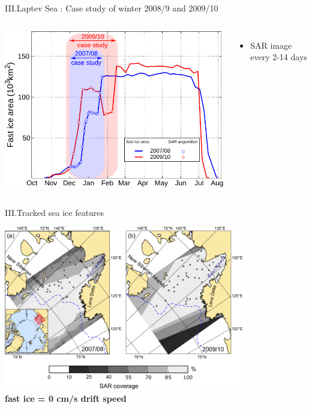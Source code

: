 \documentclass[8pt]{beamer}
\begin{document}
\setwatermark{\fontsize{125pt}{125pt}\selectfont{}}
\begin{frame}[fragile]{III.Laptev Sea : Case study of winter 2008/9 and 2009/10}
\begin{columns}
	\includegraphics[width=1\textwidth]{./img/casestudy.pdf}
	\begin{itemize}
		\item SAR image every 2-14 days
	\end{itemize}
\end{columns}
\end{frame}

\setwatermark{\fontsize{125pt}{125pt}\selectfont{}}
\begin{frame}[fragile]{III.Tracked sea ice features}

		\begin{center}
		\includegraphics[width=0.8\textwidth]{./img/trackpoints.pdf}\\
		\textbf{fast ice = 0 cm/s drift speed}
		\end{center}
\end{frame}
\end{document}
